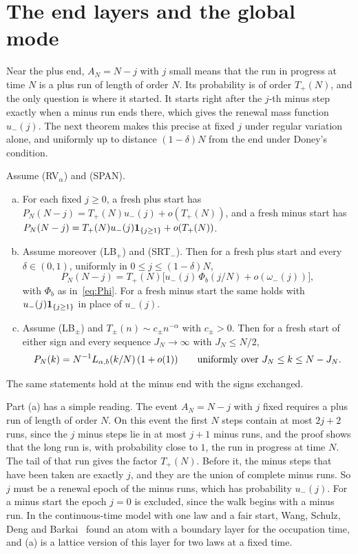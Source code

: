 \section{The end layers and the global mode}\label{sec:ends}

Near the plus end, $A_N=N-j$ with $j$ small means that the run in progress at time $N$
is a plus run of length of order $N$. Its probability is of order $T_\plus(N)$, and the
only question is where it started. It starts right after the $j$-th minus step exactly
when a minus run ends there, which gives the renewal mass function $u_\minus(j)$. The
next theorem makes this precise at fixed $j$ under regular variation alone, and
uniformly up to distance $(1-\delta)N$ from the end under Doney's condition.

\begin{introtheorem}\label{thm:ends}
Assume (RV$_\alpha$) and (SPAN).
\begin{enumerate}[(a)]
\item For each fixed $j\ge0$, a fresh plus start has
$P_N(N-j)=T_\plus(N)u_\minus(j)+o(T_\plus(N))$, and a fresh minus start has
$P_N(N-j)=T_{+}(N)u_{-}(j)\mathbf{1}_{\{j\ge1\}}+o(T_{+}(N))$.
\item Assume moreover (LB$_\plus$) and (SRT$_\minus$). Then for a fresh plus start and
every $\delta\in(0,1)$, uniformly in $0\le j\le(1-\delta)N$,
\[
 P_N(N-j)=T_\plus(N)\bigl[u_\minus(j)\,\Phi_b(j/N)+o(\omega_\minus(j))\bigr],
\]
with $\Phi_b$ as in~\eqref{eq:Phi}. For a fresh minus start the same holds with
$u_{-}(j)\mathbf{1}_{\{j\ge1\}}$ in place of $u_\minus(j)$.
\item Assume (LB$_\pm$) and $T_\pm(n)\sim c_\pm n^{-\alpha}$ with $c_\pm>0$. Then for a
fresh start of either sign and every sequence $J_N\to\infty$ with $J_N\le N/2$,
\[
 P_N(k)=N^{-1}L_{\alpha,b}(k/N)\,(1+o(1))\qquad\text{uniformly over }J_N\le k\le N-J_N .
\]
\end{enumerate}
The same statements hold at the minus end with the signs exchanged.
\end{introtheorem}

Part (a) has a simple reading. The event $A_N=N-j$ with $j$ fixed requires a plus run of length
of order $N$. On this event the first $N$ steps contain at most $2j+2$ runs, since the $j$
minus steps lie in at most $j+1$ minus runs, and the proof shows that the long run is, with
probability close to $1$, the run in progress at time $N$. The tail of
that run gives the factor $T_\plus(N)$. Before it, the minus steps that have been taken are
exactly $j$, and they are the union of complete minus runs. So $j$ must be a renewal epoch of
the minus runs, which has probability $u_\minus(j)$. For a minus start the epoch $j=0$ is
excluded, since the walk begins with a minus run. In the continuous-time model with one law
and a fair start, Wang, Schulz, Deng and Barkai~\cite[Section~VII.A]{wsdb2018} found an atom
with a boundary layer for the occupation time, and (a) is a lattice version of this layer for
two laws at a fixed time.

